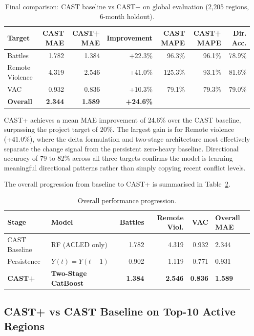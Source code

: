 \documentclass[12pt,a4paper]{article}
\begin{document}
\begin{table}[h]
\centering
\caption{Final comparison: CAST baseline vs CAST+ on global evaluation
(2,205 regions, 6-month holdout).}
\label{tab:final_global}
\begin{tabular}{lrrrrrr}
\toprule
Target & CAST MAE & CAST+ MAE & Improvement & CAST MAPE & CAST+ MAPE & Dir. Acc. \\
\midrule
Battles            & 1.782 & 1.384 & +22.3\% & 96.3\%  & 96.1\%  & 78.9\% \\
Remote Violence    & 4.319 & 2.546 & +41.0\% & 125.3\% & 93.1\%  & 81.6\% \\
VAC                & 0.932 & 0.836 & +10.3\% & 79.1\%  & 79.3\%  & 79.0\% \\
\midrule
\textbf{Overall}   & \textbf{2.344} & \textbf{1.589} & \textbf{+24.6\%} & & & \\
\bottomrule
\end{tabular}
\end{table}

CAST+ achieves a mean MAE improvement of 24.6\% over the CAST baseline,
surpassing the project target of 20\%. The largest gain is for Remote
violence (+41.0\%), where the delta formulation and two-stage
architecture most effectively separate the change signal from the
persistent zero-heavy baseline. Directional accuracy of 79 to 82\%
across all three targets confirms the model is learning meaningful
directional patterns rather than simply copying recent conflict levels.

The overall progression from baseline to CAST+ is summarised in
Table~\ref{tab:progression}.

\begin{table}[h]
\centering
\caption{Overall performance progression.}
\label{tab:progression}
\begin{tabular}{llrrrl}
\toprule
Stage & Model & Battles & Remote Viol. & VAC & Overall MAE \\
\midrule
CAST Baseline & RF (ACLED only)    & 1.782 & 4.319 & 0.932 & 2.344 \\
Persistence   & $Y(t) = Y(t-1)$   & 0.902 & 1.119 & 0.771 & 0.931 \\
\textbf{CAST+} & \textbf{Two-Stage CatBoost} & \textbf{1.384} & \textbf{2.546} & \textbf{0.836} & \textbf{1.589} \\
\bottomrule
\end{tabular}
\end{table}

\subsection{CAST+ vs CAST Baseline on Top-10 Active Regions}
\end{document}
